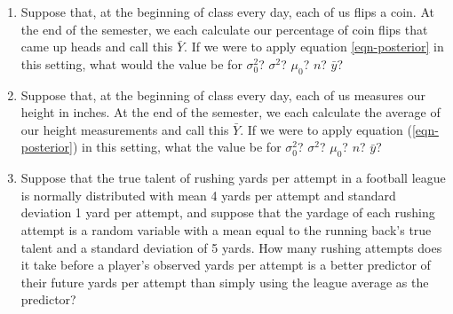 \documentclass{article}
\begin{document}
    \begin{enumerate}
      \item Suppose that, at the beginning of class every day, each of us flips a coin. At the end of the semester, we each calculate our percentage of coin flips that came up heads and call this $\bar Y$. If we were to apply equation \ref{eqn-posterior} in this setting, what would the value be for $\sigma^2_0$? $\sigma^2$? $\mu_0$? $n$? $\bar y$?
      \item Suppose that, at the beginning of class every day, each of us measures our height in inches. At the end of the semester, we each calculate the average of our height measurements and call this $\bar Y$. If we were to apply equation (\ref{eqn-posterior}) in this setting, what the value be for $\sigma^2_0$? $\sigma^2$? $\mu_0$? $n$? $\bar y$?
      \item Suppose that the true talent of rushing yards per attempt in a football league is normally distributed with mean 4 yards per attempt and standard deviation 1 yard per attempt, and suppose that the yardage of each rushing attempt is a random variable with a mean equal to the running back's true talent and a standard deviation of 5 yards. How many rushing attempts does it take before a player's observed yards per attempt is a better predictor of their future yards per attempt than simply using the league average as the predictor?
    \end{enumerate}
\end{document}
